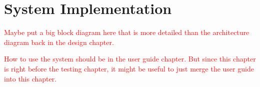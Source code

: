 \chapter{System Implementation}

\textcolor{red}{Maybe put a big block diagram here that is more detailed than the architecture diagram back in the design chapter.}

\textcolor{red}{How to use the system should be in the user guide chapter. But since this chapter is right before the testing chapter, it might be useful to just merge the user guide into this chapter.}